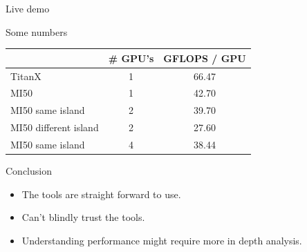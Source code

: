 \documentclass[aspectratio=169]{beamer}
\begin{document}
\begin{frame}{Live demo}
\end{frame}

\begin{frame}{Some numbers}
\begin{table}[]
\begin{tabular}{@{}lcc@{}}
\toprule
\multicolumn{1}{c}{}  & \# GPU's & GFLOPS / GPU \\ \midrule
TitanX                & 1        &     66.47    \\
MI50                  & 1        &     42.70    \\
MI50 same island      & 2        &     39.70    \\
MI50 different island & 2        &     27.60    \\
MI50 same island      & 4        &     38.44    \\ \bottomrule
\end{tabular}
\end{table}
\end{frame}

\begin{frame}{Conclusion}
\begin{itemize}
    \item The tools are straight forward to use.
    \item Can't blindly trust the tools.
    \item Understanding performance might require more in depth analysis.
\end{itemize}
\end{frame}
\end{document}
